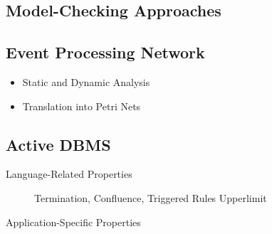 \subsection{Model-Checking Approaches \cite{Ericsson-Nilsson-Andler:2003,Ericsson-Berndtsson:2007,PhD:Ericsson:2009}}
\label{sec:FV-RW-MC}

\subsection{Event Processing Network}
\label{sec:FV-RW-EPN}

\begin{itemize}
	\item Static and Dynamic Analysis \cite{Rabinovich-Etzion-etAl:2010}
	\item Translation into Petri Nets \cite{Weidlich-Mendling-Gal:2013}
\end{itemize}

\subsection{Active DBMS}
\label{sec:ActiveDBMS}

\begin{description}
	\item[Language-Related Properties] Termination, Confluence, Triggered Rules Upperlimit
	\item[Application-Specific Properties]  
\end{description}
